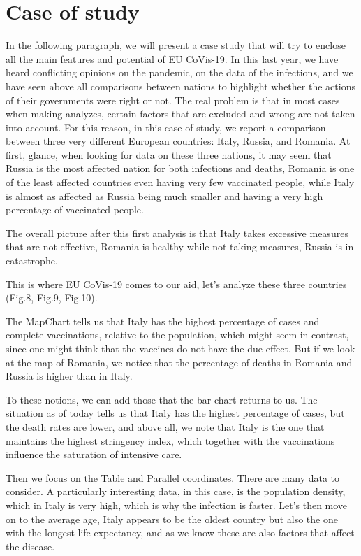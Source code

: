 \documentclass[10pt,conference]{IEEEtran}
\begin{document}
\section{Case of study}
In the following paragraph, we will present a case study that will try to enclose all the main features and potential of EU CoVis-19. In this last year, we have heard conflicting opinions on the pandemic, on the data of the infections, and we have seen above all comparisons between nations to highlight whether the actions of their governments were right or not. The real problem is that in most cases when making analyzes, certain factors that are excluded and wrong are not taken into account. For this reason, in this case of study, we report a comparison between three very different European countries: Italy, Russia, and Romania. At first, glance, when looking for data on these three nations, it may seem that Russia is the most affected nation for both infections and deaths, Romania is one of the least affected countries even having very few vaccinated people, while Italy is almost as affected as Russia being much smaller and having a very high percentage of vaccinated people.

The overall picture after this first analysis is that Italy takes excessive measures that are not effective, Romania is healthy while not taking measures, Russia is in catastrophe.

This is where EU CoVis-19 comes to our aid, let's analyze these three countries (Fig.8, Fig.9, Fig.10).

The MapChart tells us that Italy has the highest percentage of cases and complete vaccinations, relative to the population, which might seem in contrast, since one might think that the vaccines do not have the due effect. But if we look at the map of Romania, we notice that the percentage of deaths in Romania and Russia is higher than in Italy.

To these notions, we can add those that the bar chart returns to us. The situation as of today tells us that Italy has the highest percentage of cases, but the death rates are lower, and above all, we note that Italy is the one that maintains the highest stringency index, which together with the vaccinations influence the saturation of intensive care.

Then we focus on the Table and Parallel coordinates. There are many data to consider. A particularly interesting data, in this case, is the population density, which in Italy is very high, which is why the infection is faster. Let's then move on to the average age, Italy appears to be the oldest country but also the one with the longest life expectancy, and as we know these are also factors that affect the disease.
\end{document}
